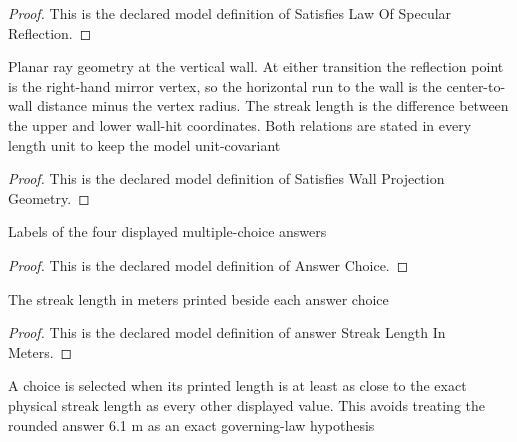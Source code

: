 \begin{proof}
  This is the declared model definition of Satisfies Law Of Specular Reflection.
\end{proof}
\begin{definition}
  \label{def:physics:phyx-mini-0062:phyxminiproblems-problemphyxmini0062-satisfieswallprojectiongeometry}
  Planar ray geometry at the vertical wall. At either transition the reflection point is the right-hand mirror vertex, so the horizontal run to the wall is the center-to-wall distance minus the vertex radius. The streak length is the difference between the upper and lower wall-hit coordinates. Both relations are stated in every length unit to keep the model unit-covariant
\end{definition}
\begin{proof}
  This is the declared model definition of Satisfies Wall Projection Geometry.
\end{proof}
\begin{definition}
  \label{def:physics:phyx-mini-0062:phyxminiproblems-problemphyxmini0062-answerchoice}
  Labels of the four displayed multiple-choice answers
\end{definition}
\begin{proof}
  This is the declared model definition of Answer Choice.
\end{proof}
\begin{definition}
  \label{def:physics:phyx-mini-0062:phyxminiproblems-problemphyxmini0062-answerstreaklengthinmeters}
  The streak length in meters printed beside each answer choice
\end{definition}
\begin{proof}
  This is the declared model definition of answer Streak Length In Meters.
\end{proof}
\begin{definition}
  \label{def:physics:phyx-mini-0062:phyxminiproblems-problemphyxmini0062-isnearestdisplayedstreaklength}
  A choice is selected when its printed length is at least as close to the exact physical streak length as every other displayed value. This avoids treating the rounded answer 6.1 m as an exact governing-law hypothesis
\end{definition}
